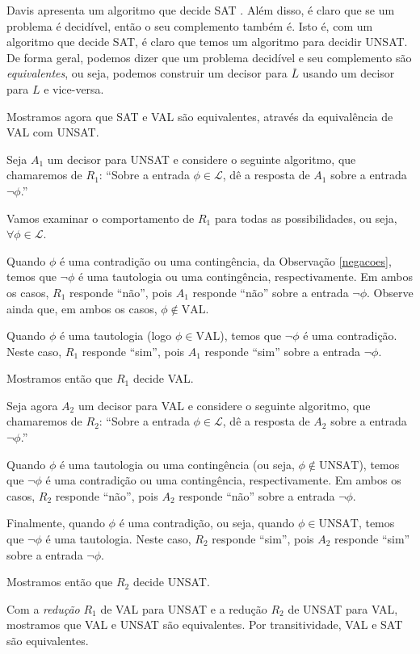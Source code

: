 Davis apresenta um algoritmo que decide SAT \cite{davis1960computing}. Além disso, é claro que se um problema é decidível, então o seu complemento também é. Isto é, com um algoritmo que decide SAT, é claro que temos um algoritmo para decidir UNSAT. De forma geral, podemos dizer que um problema decidível e seu complemento são \emph{equivalentes}, ou seja, podemos construir um decisor para $\overline{L}$ usando um decisor para $L$ e vice-versa.

Mostramos agora que SAT e VAL são equivalentes, através da equivalência de VAL com UNSAT.

Seja $A_1$ um decisor para UNSAT e considere o seguinte algoritmo, que chamaremos de $R_1$: ``Sobre a entrada $\phi \in \mathcal{L}$, dê a resposta de $A_1$ sobre a entrada $\neg \phi$.''

Vamos examinar o comportamento de $R_1$ para todas as possibilidades, ou seja, $\forall \phi \in \mathcal{L}$.

Quando $\phi$ é uma contradição ou uma contingência, da Observação \ref{negacoes}, temos que $\neg \phi$ é uma tautologia ou uma contingência, respectivamente. Em ambos os casos, $R_1$ responde ``não'', pois $A_1$ responde ``não'' sobre a entrada $\neg \phi$. Observe ainda que, em ambos os casos, $\phi \notin \text{VAL}$.

Quando $\phi$ é uma tautologia (logo $\phi \in \text{VAL}$), temos que $\neg \phi$ é uma contradição. Neste caso, $R_1$ responde ``sim'', pois $A_1$ responde ``sim'' sobre a entrada $\neg \phi$.

Mostramos então que $R_1$ decide VAL.

Seja agora $A_2$ um decisor para VAL e considere o seguinte algoritmo, que chamaremos de $R_2$: ``Sobre a entrada $\phi \in \mathcal{L}$, dê a resposta de $A_2$ sobre a entrada $\neg \phi$.''

Quando $\phi$ é uma tautologia ou uma contingência (ou seja, $\phi \notin \text{UNSAT}$), temos que $\neg \phi$ é uma contradição ou uma contingência, respectivamente. Em ambos os casos, $R_2$ responde ``não'', pois $A_2$ responde ``não'' sobre a entrada $\neg \phi$.

Finalmente, quando $\phi$ é uma contradição, ou seja, quando $\phi \in \text{UNSAT}$, temos que $\neg \phi$ é uma tautologia. Neste caso, $R_2$ responde ``sim'', pois $A_2$ responde ``sim'' sobre a entrada $\neg \phi$.

Mostramos então que $R_2$ decide UNSAT.

Com a \emph{redução} $R_1$ de VAL para UNSAT e a redução $R_2$ de UNSAT para VAL, mostramos que VAL e UNSAT são equivalentes. Por transitividade, VAL e SAT são equivalentes.

